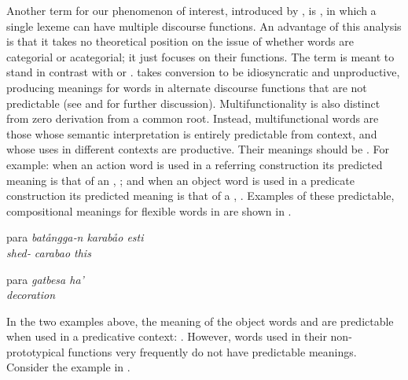 Another term for our phenomenon of interest, introduced by \parencite{Lier2012}, is , in which a single lexeme can have multiple discourse functions. An advantage of this analysis is that it takes no theoretical position on the issue of whether words are categorial or acategorial; it just focuses on their functions. The term  is meant to stand in contrast with  or . \citeauthor{Lier2012} takes conversion to be idiosyncratic and unproductive, producing meanings for words in alternate discourse functions that are not predictable (see  and  for further discussion). Multifunctionality is also distinct from zero derivation from a common root. Instead, multifunctional words are those whose semantic interpretation is entirely predictable from context, and whose uses in different contexts are productive. Their meanings should be . For example: when an action word is used in a referring construction its predicted meaning is that of an , ; and when an object word is used in a predicate construction its predicted meaning is that of a , . Examples of these predictable, compositional meanings for flexible words in  are shown in .

\begin{exe}

  \ex\label{ex:2.5}
  \begin{xlist}

    \ex\label{ex:2.5a}
    \gll para     \em{batångga‑n}     karabåo esti\\
          \em{shed‑} carabao this\\

    \ex\label{ex:2.5b}
    \gll para     \em{gatbesa}    ha'\\
          \em{decoration} \\

  \end{xlist}

\end{exe}

\noindent In the two examples above, the meaning of the object words  and  are predictable when used in a predicative context: . However, words used in their non-prototypical functions very frequently do not have predictable meanings. Consider the example in .

